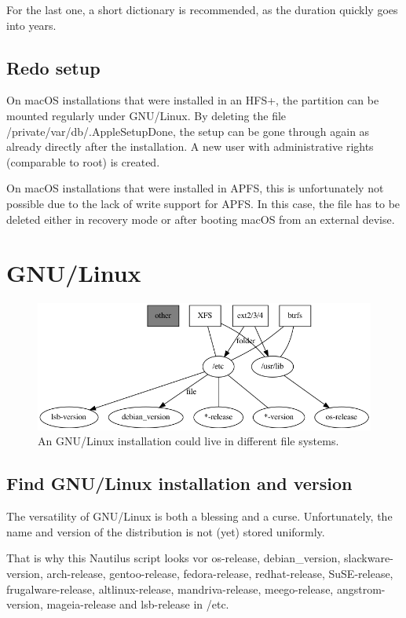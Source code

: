 For the last one, a short dictionary is recommended, as the duration quickly goes into years.

\subsection{Redo setup}

On macOS installations that were installed in an HFS+, the partition can be mounted regularly under GNU/Linux. By deleting the file /private/var/db/.AppleSetupDone, the setup can be gone through again as already directly after the installation. A new user with administrative rights (comparable to root) is created.

On macOS installations that were installed in APFS, this is unfortunately not possible due to the lack of write support for APFS. In this case, the file has to be deleted either in recovery mode or after booting macOS from an external devise.

\section{GNU/Linux}

\begin{figure}[htbp]  %
  \centering
  \includegraphics[width=.5\textwidth]{figures/fs-to-Linux.png}
  \caption[File systems and GNU/Linux]{An GNU/Linux installation could live in different file systems.}
  \label{fig:fs-lin}
\end{figure}

\subsection{Find GNU/Linux installation and version}

The versatility of GNU/Linux is both a blessing and a curse. Unfortunately, the name and version of the distribution is not (yet) stored uniformly.

That is why this Nautilus script looks vor
os-release,
debian\_version,
slackware-version,
arch-release,
gentoo-release,
fedora-release,
redhat-release,
SuSE-release,
frugalware-release,
altlinux-release,
mandriva-release,
meego-release,
angstrom-version,
mageia-release and
lsb-release
in /etc.

